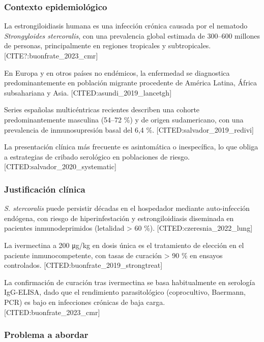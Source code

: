 \documentclass[
  spanish,
  12pt,
  a4paper,
]{article}
\begin{document}
\subsubsection{Contexto
epidemiológico}\label{contexto-epidemioluxf3gico}

La estrongiloidiasis humana es una infección crónica causada por el
nematodo \emph{Strongyloides stercoralis}, con una prevalencia global
estimada de 300--600 millones de personas, principalmente en regiones
tropicales y subtropicales. {[}CITE?:buonfrate\_2023\_cmr{]}

En Europa y en otros países no endémicos, la enfermedad se diagnostica
predominantemente en población migrante procedente de América Latina,
África subsahariana y Asia. {[}CITED:asundi\_2019\_lancetgh{]}

Series españolas multicéntricas recientes describen una cohorte
predominantemente masculina (54--72 \%) y de origen sudamericano, con
una prevalencia de inmunosupresión basal del 6,4 \%.
{[}CITED:salvador\_2019\_redivi{]}

La presentación clínica más frecuente es asintomática o inespecífica, lo
que obliga a estrategias de cribado serológico en poblaciones de riesgo.
{[}CITED:salvador\_2020\_systematic{]}

\subsubsection{Justificación clínica}\label{justificaciuxf3n-cluxednica}

\emph{S. stercoralis} puede persistir décadas en el hospedador mediante
auto-infección endógena, con riesgo de hiperinfestación y
estrongiloidiasis diseminada en pacientes inmunodeprimidos (letalidad
\textgreater{} 60 \%). {[}CITED:czeresnia\_2022\_lung{]}

La ivermectina a 200 μg/kg en dosis única es el tratamiento de elección
en el paciente inmunocompetente, con tasas de curación \textgreater{} 90
\% en ensayos controlados. {[}CITED:buonfrate\_2019\_strongtreat{]}

La confirmación de curación tras ivermectina se basa habitualmente en
serología IgG-ELISA, dado que el rendimiento parasitológico
(coprocultivo, Baermann, PCR) es bajo en infecciones crónicas de baja
carga. {[}CITED:buonfrate\_2023\_cmr{]}

\subsubsection{Problema a abordar}\label{problema-a-abordar}
\end{document}
